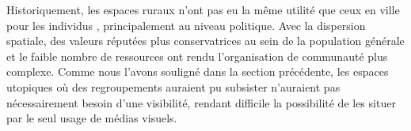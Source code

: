 Historiquement, les espaces ruraux n'ont pas eu la même utilité que ceux en ville pour les individus \lgbt{}, principalement au niveau politique.
Avec la dispersion spatiale, des valeurs réputées plus conservatrices au sein de la population générale et le faible nombre de ressources ont rendu l'organisation de communauté \lgbt{} plus complexe.
Comme nous l'avons souligné dans la section précédente, les espaces utopiques où des regroupements \lgbt{} auraient pu subsister n'auraient pas nécessairement besoin d'une visibilité, rendant difficile la possibilité de les situer par le seul usage de médias visuels.



